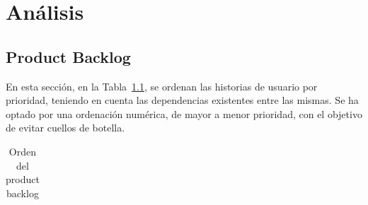 \chapter{Análisis}

\section{Product Backlog}
En esta sección, en la Tabla~\ref{tab:huprioridad}, se ordenan las historias de usuario por prioridad, teniendo en cuenta las dependencias existentes entre las mismas. Se ha optado por una ordenación numérica, de mayor a menor prioridad, con el objetivo de evitar cuellos de botella.

\begin{longtable}{>{\centering\arraybackslash}m{1.5cm} m{8cm} >{\centering\arraybackslash}m{2cm}}

\caption{Orden del product backlog}
\label{tab:huprioridad} \\    


\end{longtable}

